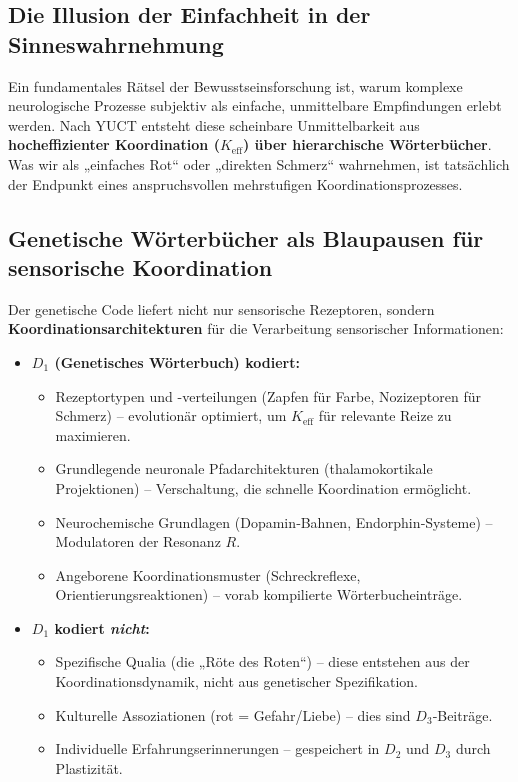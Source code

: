 \documentclass[12pt,a4paper]{article}
\newcommand{\eff}{\mathrm{eff}}
\newcommand{\Ke}{K_{\eff}}
\begin{document}
	\subsection{Die Illusion der Einfachheit in der Sinneswahrnehmung}
	
	Ein fundamentales Rätsel der Bewusstseinsforschung ist, warum komplexe neurologische Prozesse subjektiv als einfache, unmittelbare Empfindungen erlebt werden. Nach YUCT entsteht diese scheinbare Unmittelbarkeit aus \textbf{hocheffizienter Koordination ($\Ke$) über hierarchische Wörterbücher}. Was wir als „einfaches Rot“ oder „direkten Schmerz“ wahrnehmen, ist tatsächlich der Endpunkt eines anspruchsvollen mehrstufigen Koordinationsprozesses.
	
	\subsection{Genetische Wörterbücher als Blaupausen für sensorische Koordination}
	
	Der genetische Code liefert nicht nur sensorische Rezeptoren, sondern \textbf{Koordinationsarchitekturen} für die Verarbeitung sensorischer Informationen:
	
	\begin{itemize}
		\item \textbf{$D_1$ (Genetisches Wörterbuch) kodiert:}
		\begin{itemize}
			\item Rezeptortypen und -verteilungen (Zapfen für Farbe, Nozizeptoren für Schmerz) – evolutionär optimiert, um $\Ke$ für relevante Reize zu maximieren.
			\item Grundlegende neuronale Pfadarchitekturen (thalamokortikale Projektionen) – Verschaltung, die schnelle Koordination ermöglicht.
			\item Neurochemische Grundlagen (Dopamin‑Bahnen, Endorphin‑Systeme) – Modulatoren der Resonanz $R$.
			\item Angeborene Koordinationsmuster (Schreckreflexe, Orientierungsreaktionen) – vorab kompilierte Wörterbucheinträge.
		\end{itemize}
		
		\item \textbf{$D_1$ kodiert \textit{nicht}:}
		\begin{itemize}
			\item Spezifische Qualia (die „Röte des Roten“) – diese entstehen aus der Koordinationsdynamik, nicht aus genetischer Spezifikation.
			\item Kulturelle Assoziationen (rot = Gefahr/Liebe) – dies sind $D_3$‑Beiträge.
			\item Individuelle Erfahrungserinnerungen – gespeichert in $D_2$ und $D_3$ durch Plastizität.
		\end{itemize}
	\end{itemize}
	
\end{document}
